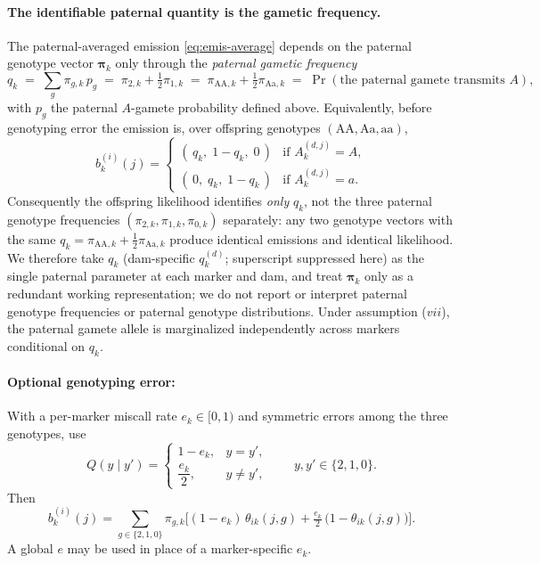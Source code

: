 \documentclass[11pt]{article}
\begin{document}
\paragraph{The identifiable paternal quantity is the gametic frequency.}
The paternal-averaged emission \eqref{eq:emis-average} depends on the paternal genotype vector
$\boldsymbol\pi_k$ only through the \emph{paternal gametic frequency}
\[
q_k \;=\; \sum_{g}\pi_{g,k}\,p_g
\;=\; \pi_{2,k}+\tfrac12\pi_{1,k}
\;=\; \pi_{\mathrm{AA},k}+\tfrac12\pi_{\mathrm{Aa},k}
\;=\; \Pr(\text{the paternal gamete transmits }A),
\]
with $p_g$ the paternal $A$-gamete probability defined above. Equivalently, before genotyping error
the emission is, over offspring genotypes $(\mathrm{AA},\mathrm{Aa},\mathrm{aa})$,
\[
b_k^{(i)}(j)=
\begin{cases}
(\,q_k,\;1-q_k,\;0\,) & \text{if } A_k^{(d,j)}=A,\\[2pt]
(\,0,\;q_k,\;1-q_k\,) & \text{if } A_k^{(d,j)}=a.
\end{cases}
\]
Consequently the offspring likelihood identifies \emph{only} $q_k$, not the three paternal genotype
frequencies $(\pi_{2,k},\pi_{1,k},\pi_{0,k})$ separately: any two genotype vectors with the same
$q_k=\pi_{\mathrm{AA},k}+\tfrac12\pi_{\mathrm{Aa},k}$ produce identical emissions and identical
likelihood. We therefore take $q_k$ (dam-specific $q_k^{(d)}$; superscript suppressed here) as the
single paternal parameter at each marker and dam, and treat $\boldsymbol\pi_k$ only as a redundant
working representation; we do not report or interpret paternal genotype frequencies or paternal
genotype distributions. Under assumption ($vii$), the paternal gamete allele is marginalized
independently across markers conditional on $q_k$.

\paragraph{Optional genotyping error:}
With a per-marker miscall rate $e_k\in[0,1)$ and symmetric errors among the three genotypes, use
\[
Q(y\mid y')=
\begin{cases}
1-e_k,& y=y',\\[4pt]
\dfrac{e_k}{2},& y\neq y',
\end{cases}
\qquad y,y'\in\{2,1,0\}.
\]
Then
\begin{equation}
b_k^{(i)}(j)
= \sum_{g\in\{2,1,0\}} \pi_{g,k}
   \Big[(1-e_k)\,\theta_{ik}(j,g)
        + \tfrac{e_k}{2}\,\big(1-\theta_{ik}(j,g)\big)\Big].
\label{eq:emission-error}
\end{equation}
A global $e$ may be used in place of a marker-specific $e_k$.
\end{document}
